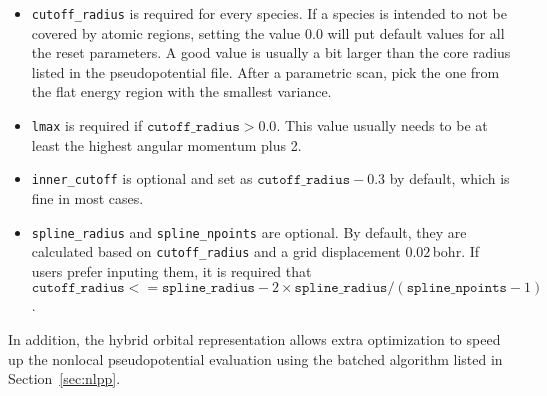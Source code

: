 \begin{itemize}
  \item \texttt{cutoff\_radius} is required for every species. If a species is intended to not be covered by atomic regions, setting the value 0.0 will put default values for all the reset parameters. A good value is usually a bit larger than the core radius listed in the pseudopotential file. After a parametric scan, pick the one from the flat energy region with the smallest variance.
  \item \texttt{lmax} is required if $\texttt{cutoff\_radius} > 0.0$. This value usually needs to be at least the highest angular momentum plus 2.
  \item \texttt{inner\_cutoff} is optional and set as $\texttt{cutoff\_radius}-0.3$ by default, which is fine in most cases.
  \item \texttt{spline\_radius} and \texttt{spline\_npoints} are optional. By default, they are calculated based on \texttt{cutoff\_radius} and a grid displacement $0.02$\,bohr.
        If users prefer inputing them, it is required that $\texttt{cutoff\_radius}<=\texttt{spline\_radius}-2\times\texttt{spline\_radius}/(\texttt{spline\_npoints}-1)$.
\end{itemize}

In addition, the hybrid orbital representation allows extra optimization to speed up the nonlocal pseudopotential evaluation using the batched algorithm listed in Section~\ref{sec:nlpp}.
